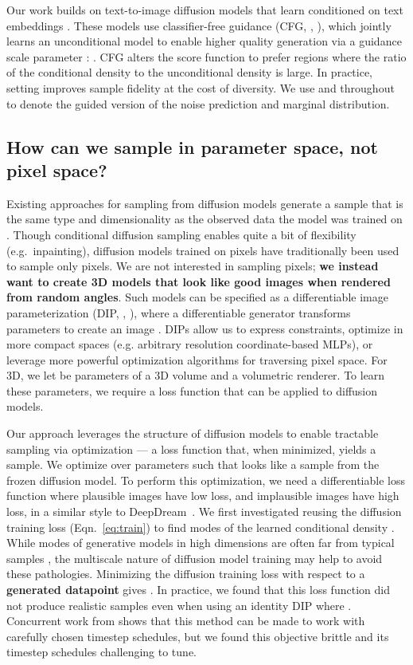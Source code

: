 \documentclass{article} \usepackage{iclr2023_conference,times}
\begin{document}
Our work builds on text-to-image diffusion models that learn  conditioned on text embeddings  \citep{imagen, dalle2, Nichol2022GLIDETP}. These models use classifier-free guidance (CFG, \citeauthor{classifierfree}, \citeyear{classifierfree}), which jointly learns an unconditional model to enable higher quality generation via a guidance scale parameter :
.
CFG alters the score function to prefer regions where the ratio of the conditional density to the unconditional density is large. In practice, setting  improves sample fidelity at the cost of diversity. We use  and  throughout to denote the guided version of the noise prediction and marginal distribution.




\subsection{How can we sample in parameter space, not pixel space?}
Existing approaches for sampling from diffusion models generate a sample that is the same type and dimensionality as the observed data the model was trained on \citep{scoresde, ddim}.
Though conditional diffusion sampling enables quite a bit of flexibility (e.g.\ inpainting), diffusion models trained on pixels have traditionally been used to sample only pixels.
We are not interested in sampling pixels; \textbf{we instead want to create 3D models that look like good images when rendered from random angles}. Such models can be specified as a differentiable image parameterization (DIP, \citeauthor{mordvintsev2018differentiable}, \citeyear{mordvintsev2018differentiable}), where a differentiable generator  transforms parameters  to create an image . DIPs allow us to express constraints, optimize in more compact spaces (e.g. arbitrary resolution coordinate-based MLPs), or leverage more powerful optimization algorithms for traversing pixel space.  For 3D, we let  be parameters of a 3D volume and  a volumetric renderer. To learn these parameters, we require a loss function that can be applied to diffusion models.

Our approach leverages the structure of diffusion models to enable tractable sampling via optimization --- a loss function that, when minimized, yields a sample. We optimize over parameters  such that  looks like a sample from the frozen diffusion model. To perform this optimization, we need a differentiable loss function where plausible images have low loss, and implausible images have high loss, in a similar style to DeepDream~\citep{deepdream}.
We first investigated reusing the diffusion training loss (Eqn.~\ref{eq:train}) to find modes of the learned conditional density . While modes of generative models in high dimensions are often far from typical samples \citep{mlebad}, the multiscale nature of diffusion model training may help to avoid these pathologies.  Minimizing the diffusion training loss with respect to a {\bf generated datapoint}  gives .
In practice, we found that this loss function did not produce realistic samples even when using an identity DIP where . Concurrent work from \citet{ddpmpnp} shows that this method can be made to work with carefully chosen timestep schedules, but we found this objective brittle and its timestep schedules challenging to tune. 
\end{document}
